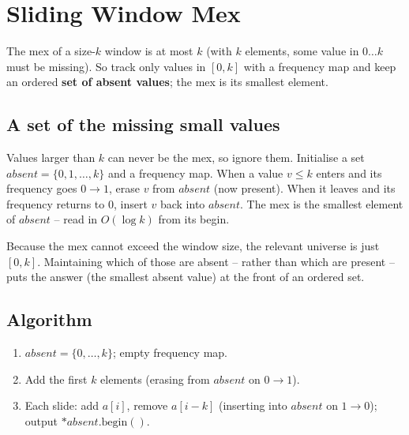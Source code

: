 \section{Sliding Window Mex}
\label{sec:cses-sw-mex}


\begin{patternbox}
The mex of a size-$k$ window is at most $k$ (with $k$ elements, some value
in $0\ldots k$ must be missing). So track only values in $[0,k]$ with a
frequency map and keep an ordered \textbf{set of absent values}; the mex is
its smallest element.
\end{patternbox}

\subsection*{A set of the missing small values}

Values larger than $k$ can never be the mex, so ignore them. Initialise a
set $\textit{absent}=\{0,1,\ldots,k\}$ and a frequency map. When a value
$v\le k$ enters and its frequency goes $0\to1$, erase $v$ from
$\textit{absent}$ (now present). When it leaves and its frequency returns
to $0$, insert $v$ back into $\textit{absent}$. The mex is the smallest
element of $\textit{absent}$ -- read in $O(\log k)$ from its begin.

\begin{ideabox}
Because the mex cannot exceed the window size, the relevant universe is
just $[0,k]$. Maintaining which of those are absent -- rather than which are
present -- puts the answer (the smallest absent value) at the front of an
ordered set.
\end{ideabox}

\subsection*{Algorithm}

\begin{enumerate}
  \item $\textit{absent}=\{0,\ldots,k\}$; empty frequency map.
  \item Add the first $k$ elements (erasing from $\textit{absent}$ on
        $0\to1$).
  \item Each slide: add $a[i]$, remove $a[i-k]$ (inserting into
        $\textit{absent}$ on $1\to0$); output $\ast\textit{absent}.
        \text{begin}()$.
\end{enumerate}

